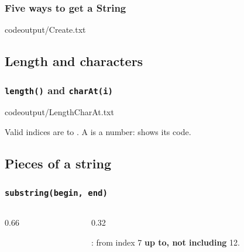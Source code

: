 \documentclass[aspectratio=169,10pt,compress]{beamer}
\begin{document}
\begin{frame}[t,fragile] \frametitle{Five ways to get a String}
			{codeoutput/Create.txt}
\end{frame}



\subsection[Length]{Length and characters}




\begin{frame}[t,fragile] \frametitle{\texttt{length()} and \texttt{charAt(i)}}
			{codeoutput/LengthCharAt.txt}

	\vspace{0.3em}
	\small Valid indices are  to . 
	A  is a number:  shows its code.
\end{frame}




\subsection[Substring]{Pieces of a string}




\begin{frame}[t,fragile] \frametitle{\texttt{substring(begin, end)}}
\begin{columns}[T]
	\begin{column}{0.66\textwidth}
	\end{column}
	\begin{column}{0.32\textwidth}
		\begin{center}
		\end{center}
		\small {}: from index 7 \textbf{up to, not including} 12.
		\vspace{0.3em}

	\end{column}
\end{columns}
\end{frame}
\end{document}
